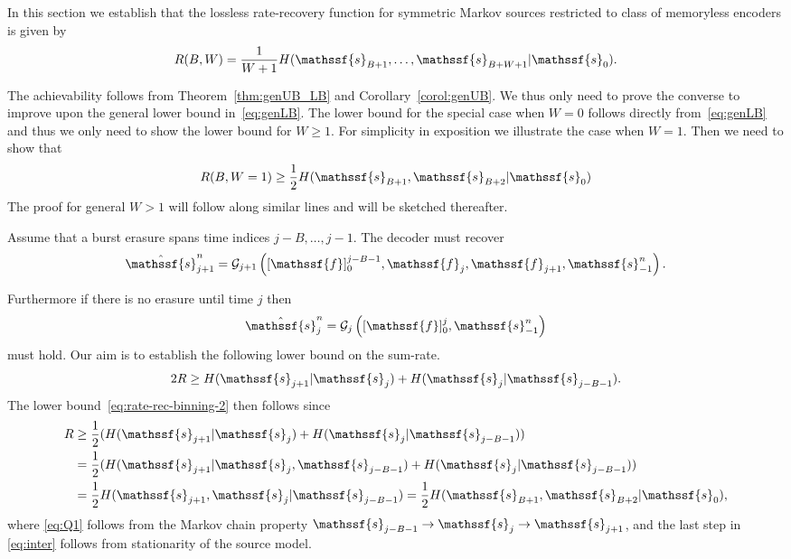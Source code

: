 \documentclass[journal, twocolumn, 10pt]{IEEEtran}
\newcommand{\cG}{{\mathcal{G}}}
\newcommand{\eps}{\varepsilon}
\newcommand{\rvf}{{\mathssf{f}}}    %
\newcommand{\rvs}{{\mathssf{s}}}    %
\begin{document}
In this section we establish that the lossless rate-recovery function for symmetric Markov sources restricted to class of memoryless encoders is given by
\begin{align}
R(B,W) = \frac{1}{W+1}H(\rvs_{B+1}, \ldots, \rvs_{B+W+1} | \rvs_{0}).
\end{align} 

The achievability follows from Theorem~\ref{thm:genUB_LB} and Corollary~\ref{corol:genUB}. We thus only need to prove the converse to improve upon the general lower bound in~\eqref{eq:genLB}. 
The lower bound for the special case when $W=0$ follows directly from~\eqref{eq:genLB} and thus we only need to show the lower bound for $W \ge 1$. 
For simplicity in exposition we illustrate the case when $W=1$. Then we need to show that 
\begin{align}
R(B,W=1) \ge \frac{1}{2} H(\rvs_{B+1}, \rvs_{B+2}|\rvs_0)\label{eq:rate-rec-binning-2}
\end{align}
The proof for general $W > 1$ will follow along similar lines and will be sketched thereafter. 


Assume that a burst erasure spans time indices ${j-B, \ldots, j-1}$. The decoder must recover 
\begin{equation}
\label{eq:decoder1}
{\hat\rvs}_{j+1}^n = \cG_{j+1}\left([\rvf]_0^{j-B-1}, \rvf_{j}, \rvf_{j+1}, \rvs_{-1}^n\right).
\end{equation} 

Furthermore if there is no erasure until time $j$ then \begin{align}\hat{\rvs}_j^n = \cG_j\left([\rvf]_0^{j}, \rvs_{-1}^n\right)\label{eq:decoder0}\end{align} must hold. 
Our aim is to 
establish the following lower bound on the sum-rate.
\begin{equation}
\label{eq:Rj_lb}
2R \ge H(\rvs_{j+1}|\rvs_j) + H(\rvs_{j}|\rvs_{j-B-1}).
\end{equation}
The lower bound~\eqref{eq:rate-rec-binning-2} then  follows since \begin{align}
R&\ge \frac{1}{2}(H(\rvs_{j+1}|\rvs_j) + H(\rvs_{j}|\rvs_{j-B-1}))\notag\\
&=\frac{1}{2}(H(\rvs_{j+1}|\rvs_j,\rvs_{j-B-1}) + H(\rvs_{j}|\rvs_{j-B-1}))\label{eq:Q1}\\
&=\frac{1}{2}H(\rvs_{j+1},\rvs_{j}|\rvs_{j-B-1}) =\frac{1}{2}H(\rvs_{B+1},\rvs_{B+2}|\rvs_0),\label{eq:inter}
\end{align}
where \eqref{eq:Q1} follows from the Markov chain property $\rvs_{j-B-1} \rightarrow \rvs_{j} \rightarrow \rvs_{j+1}$, and the last step in \eqref{eq:inter} follows from stationarity of the source model.
\end{document}
